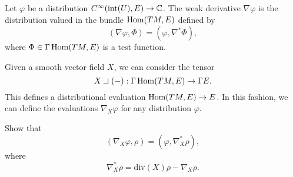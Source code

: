\begin{defn}
  Let $\varphi$ be a distribution $C^{\infty}(\text{int}(U), E)\to \mathbb{C}$. The weak derivative $\nabla \varphi$ is the distribution valued in the bundle $\operatorname{\mathrm{Hom}}(TM,E)$ defined by
  \begin{equation*}
    (\nabla \varphi,\Phi)=(\varphi,\nabla^{*}\Phi),
  \end{equation*}
  where $\Phi\in \Gamma\operatorname{\mathrm{Hom}}(TM,E)$ is a test function.

  Given a smooth vector field $X$, we can consider the tensor
  \begin{equation*}
    X\intprod(-):\Gamma\Hom (TM,E)\to \Gamma E.
  \end{equation*}
  This defines a distributional evaluation $\operatorname{\mathrm{Hom}}(TM,E)\to E$. In this fashion, we can define the evaluations $\nabla_{X}\varphi$ for any distribution $\varphi$.
  \begin{xca}
    Show that
    \begin{equation*}
      (\nabla_{X}\varphi,\rho)=(\varphi,\nabla_{X}^{*}\rho),
    \end{equation*}
    where
    \begin{equation*}
      \nabla_{X}^{*}\rho=\text{div}(X)\rho-\nabla_{X}\rho.
    \end{equation*}    
  \end{xca}  
\end{defn}


